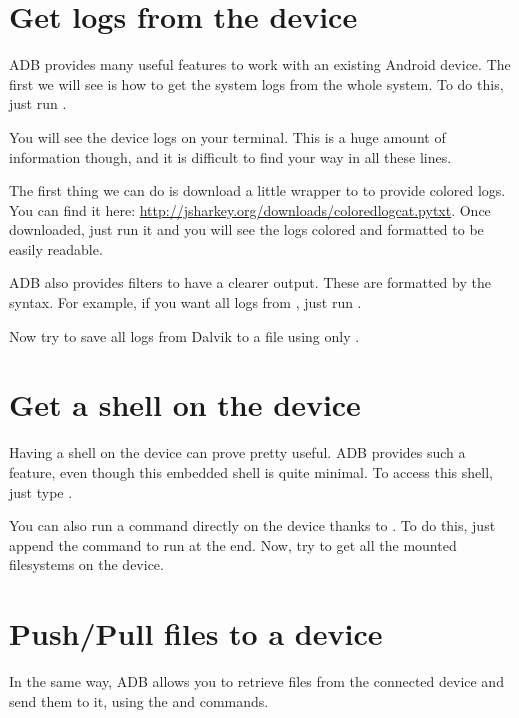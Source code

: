 \section{Get logs from the device}

ADB provides many useful features to work with an existing Android
device.  The first we will see is how to get the system logs from the
whole system. To do this, just run .

You will see the device logs on your terminal. This is a huge amount
of information though, and it is difficult to find your way in all
these lines.

The first thing we can do is download a little wrapper to 
to provide colored logs. You can find it here:
\url{http://jsharkey.org/downloads/coloredlogcat.pytxt}. Once
downloaded, just run it and you will see the logs colored and
formatted to be easily readable.

ADB also provides filters to have a clearer output. These are
formatted by the  syntax. For example, if you want
all logs from , just run .

Now try to save all logs from Dalvik to a file using only .

\section{Get a shell on the device}

Having a shell on the device can prove pretty useful. ADB provides
such a feature, even though this embedded shell is quite minimal. To
access this shell, just type .

You can also run a command directly on the device thanks to
. To do this, just append the command to run at the
end. Now, try to get all the mounted filesystems on the device.

\section{Push/Pull files to a device}

In the same way, ADB allows you to retrieve files from the connected
device and send them to it, using the  and 
commands.

